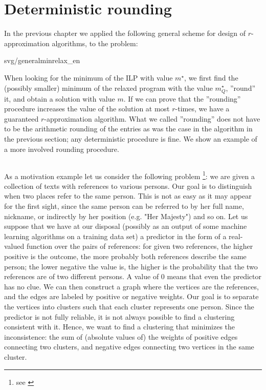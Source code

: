 \section{Deterministic rounding}

In the previous chapter we applied the following general scheme for design of $r$-approximation 
algorithms, to the \minvcover problem:


\begin{myfig}{0.7\textwidth}{svg/generalminrelax_en}
\end{myfig}

\noindent
When looking for  the minimum of the ILP with value $m^\star$, we first find the (possibly smaller)
minimum of the relaxed program with the value $m^\star_Q$, ''round'' it, and obtain a solution with value $m$.
If we can prove that the ''rounding'' procedure increases the value of the solution at most $r$-times, we have
a guaranteed $r$-approximation algorithm. What we called ''rounding'' does not have to be the arithmetic rounding 
of the entries as was the case in the \minvcover algorithm in the previous section; any deterministic procedure 
is fine. We show an example of a more involved rounding procedure.

\subsection*{\minmulticut}

As a motivation example let us consider the following problem \footnote{see 
\cite{BBC04,EF03}}: 
we are given a collection of texts with references to various persons. Our goal is to 
distinguish when two places refer to the same person. This is not as easy as it may appear for
the first sight, since the same person can be referred to by her full name, nickname, or indirectly
by her position (e.g. "Her Majesty") and so on. Let us suppose that we have at our disposal 
(possibly as an output of some machine learning algorithms on a training data set)
a predictor in the form of a real-valued function over the pairs of references: for given two references, the higher
positive is the outcome, the more probably both references describe the same person; the lower negative the value
is, the higher is the probability that the two references are of two different persons. A value of 0 means that
even the predictor has no clue. We can then construct a graph where the vertices are the references, and 
the edges are labeled by positive or negative weights. Our goal is to separate the vertices into clusters such that
each cluster represents one person. Since the predictor is not fully reliable, it is not always possible to find
a clustering consistent with it. Hence, we want to find a clustering that minimizes the inconsistence:
the sum of (absolute values of) the weights of positive edges connecting two clusters, and negative edges 
connecting two vertices in the same cluster.

